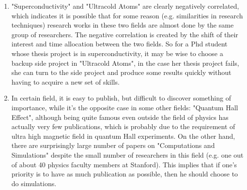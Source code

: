 \documentclass[DIV=calc, paper=letter, fontsize=10pt, twocolumn]{scrartcl}	 %
\begin{document}
\begin{enumerate}
\item "Superconductivity" and "Ultracold Atoms" are clearly negatively correlated, which indicates it is possible that for some reason (e.g. similarities in research techniques) research works in these two fields are almost done by the same group of researchers. The negative correlation is created by the shift of their interest and time allocation between the two fields. So for a Phd student whose thesis project is in superconductivity, it may be wise to choose a backup side project in "Ultracold Atoms", in the case her thesis project fails, she can turn to the side project and produce some results quickly without having to acquire a new set of skills.
\item In certain field, it is easy to publish, but difficult to discover something of importance, while it's the opposite case in some other fields: "Quantum Hall Effect", although being quite famous even outside the field of physics has actually very few publications, which is probably due to the requirement of ultra high magnetic field in quantum Hall experiments. On the other hand, there are surprisingly large number of papers on "Computations and Simulations" despite the small number of researchers in this field (e.g. one out of about 40 physics faculty members at Stanford). This implies that if one's priority is to have as much publication as possible, then he should choose to do simulations.
\end{enumerate}
\end{document}
